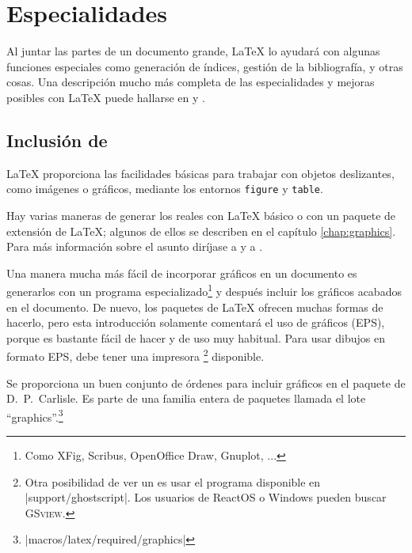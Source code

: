  
\chapter{Especialidades}
\begin{intro}
  Al juntar las partes de un documento grande,  \LaTeX{} lo ayudará
  con algunas funciones especiales como generación de índices, gestión
  de la bibliografía, y otras cosas.  Una descripción mucho más
  completa de las especialidades y mejoras posibles con  \LaTeX{}
  puede hallarse en 
  {\normalfont\manual{}} y {\normalfont \companion}.
\end{intro}

\section{Inclusión de \EPSi{}}\label{eps}
\LaTeX{} proporciona las facilidades básicas para trabajar con objetos
deslizantes, como imágenes o gráficos, mediante los entornos
\texttt{figure} y \texttt{table}.

Hay varias maneras de generar los  reales con  \LaTeX{}
básico o con un paquete de extensión de \LaTeX{}; algunos de ellos se
describen en el capítulo \ref{chap:graphics}.  Para más información
sobre el asunto diríjase a \companion{} y a \manual{}.

Una manera mucha más fácil de incorporar gráficos en un documento es
generarlos con un programa especializado\footnote{Como XFig, Scribus,
  OpenOffice Draw, Gnuplot, ...} y después incluir los gráficos
acabados en el documento.  De nuevo, los paquetes de \LaTeX{} ofrecen
muchas formas de hacerlo, pero esta introducción solamente comentará
el uso de gráficos \EPSi{}
(EPS), porque es bastante fácil de hacer y de uso muy habitual.  Para
usar dibujos en formato EPS, debe tener una impresora
\PSi{}\footnote{Otra posibilidad de ver un \PSi{} es usar el programa \textsc{}
  disponible en
  \CTANref|support/ghostscript|.  Los usuarios de ReactOS o Windows pueden
  buscar \textsc{GSview}.} disponible.

Se proporciona un buen conjunto de órdenes para incluir gráficos en el paquete
 de D.~P.~Carlisle.  Es parte de una familia entera de
paquetes llamada el lote ``graphics''.\footnote{\CTANref|macros/latex/required/graphics|}

